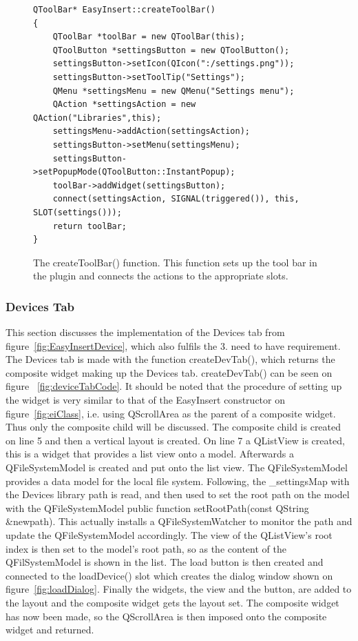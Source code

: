 \begin{figure}[h] %
\centering
\lstset{language=C++} 
\begin{lstlisting}[frame=single] 
QToolBar* EasyInsert::createToolBar()
{ 
	QToolBar *toolBar = new QToolBar(this);
	QToolButton *settingsButton = new QToolButton();
	settingsButton->setIcon(QIcon(":/settings.png"));
	settingsButton->setToolTip("Settings");
	QMenu *settingsMenu = new QMenu("Settings menu");
	QAction *settingsAction = new QAction("Libraries",this);
	settingsMenu->addAction(settingsAction);
	settingsButton->setMenu(settingsMenu);
	settingsButton->setPopupMode(QToolButton::InstantPopup);
	toolBar->addWidget(settingsButton);
	connect(settingsAction, SIGNAL(triggered()), this, SLOT(settings()));
	return toolBar;
}
\end{lstlisting}
\caption{The createToolBar() function. This function sets up the tool bar in the plugin and connects the actions to the appropriate slots.}
\label{fig:settingsToolBarCode} 	
\end{figure}

\subsubsection{Devices Tab}
\label{sec:DeviceTab}
This section discusses the implementation of the Devices tab from figure~\ref{fig:EasyInsertDevice}, which also fulfils the 3. need to have requirement. The Devices tab is made with the function createDevTab(), which returns the composite widget making up the Devices tab. createDevTab() can be seen on figure ~\ref{fig:deviceTabCode}.
It should be noted that the procedure of setting up the widget is very similar to that of the EasyInsert constructor on figure~\ref{fig:eiClass}, i.e. using QScrollArea as the parent of a composite widget. Thus only the composite child will be discussed.  The composite child is created on line 5 and then a vertical layout is created. On line 7 a QListView is created, this is a widget that provides a list view onto a model. Afterwards a QFileSystemModel is created and put onto the list view. The QFileSystemModel provides a data model for the local file system. Following, the \_settingsMap with the Devices library path is read, and then used to set the root path on the model with the QFileSystemModel public function setRootPath(const QString \&newpath). This actually installs a QFileSystemWatcher to monitor the path and update the QFileSystemModel accordingly. The view of the QListView's root index is then set to the model's root path, so as the content of the QFilSystemModel is shown in the list. The load button is then created and connected to the loadDevice() slot which creates the dialog window shown on figure~\ref{fig:loadDialog}. Finally the widgets, the view and the button, are added to the layout and the composite widget gets the layout set. The composite widget has now been made, so the QScrollArea is then imposed onto the composite widget and returned. 

